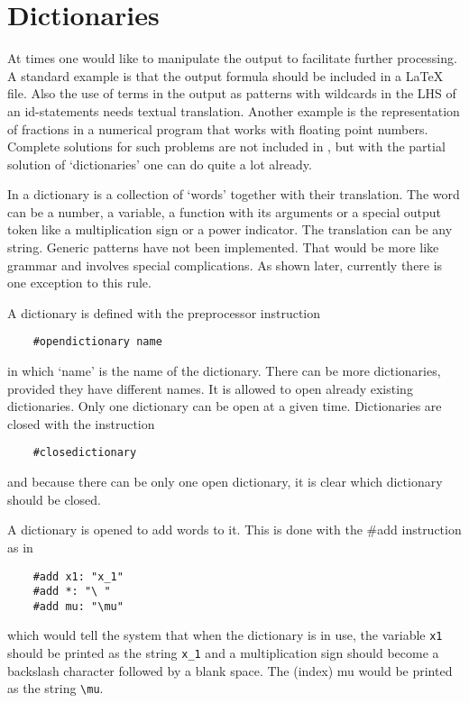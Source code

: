 
\chapter{Dictionaries}
\label{dictionaries}

At times one would like to manipulate the output to facilitate further 
processing. A standard example is that the output formula should be 
included in a \LaTeX{} file. Also the use of terms in the output as 
patterns with wildcards in the LHS of an id-statements needs textual 
translation. Another example is the representation of 
fractions in a numerical program that works with floating point numbers. 
Complete solutions for such problems are not included in \FORM{}, but with 
the partial solution of `dictionaries' one can do quite 
a lot already.

In \FORM{} a dictionary is a collection of `words' together with 
their translation. The word can be a number, a variable, 
a function with its arguments or a special output token like a 
multiplication sign or a power indicator. The translation can be any 
string. Generic patterns have not been implemented. That would be more like 
grammar and involves special complications. As shown later, currently there 
is one exception to this rule.

A dictionary is defined with the preprocessor 
instruction
\begin{verbatim}
    #opendictionary name
\end{verbatim}
in which `name' is the name of the dictionary. There can be more 
dictionaries, provided they have different names. It is allowed to open 
already existing dictionaries. Only one dictionary can be open at a given 
time. Dictionaries are closed with the instruction
\begin{verbatim}
    #closedictionary
\end{verbatim}
and because there can be only one open dictionary, it is clear which 
dictionary should be closed.

A dictionary is opened to add words to it. This is done with the \#add 
instruction as in
\begin{verbatim}
    #add x1: "x_1"
    #add *: "\ "
    #add mu: "\mu"
\end{verbatim}
which would tell the system that when the dictionary is in use, the 
variable \verb:x1: should be printed as the string \verb:x_1: and a 
multiplication sign should become a backslash character followed by a 
blank space. The (index) mu would be printed as the string \verb:\mu:.

